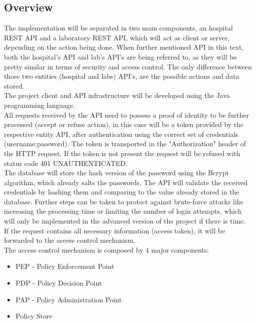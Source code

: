 \subsection{Overview}

The implementation will be separated in two main components, an hospital REST API\cite{springmvc} and a laboratory REST API, which will act as client or server, depending on the action being done. When further mentioned API in this text, both the hospital's API and lab's API's are being referred to, as they will be pretty similar in terms of security and access control. The only difference between those two entities (hospital and labs) API's, are the possible actions and data stored. \\

The project client and API infrastructure will be developed using the Java programming language. \\

All requests received by the API need to possess a proof of identity to be further processed (accept or refuse action), in this case will be a token provided by the respective entity API, after authentication using the correct set of credentials (username:password). The token is transported in the "Authorization" header of the HTTP request. If the token is not present the request will be refused with status code 401 UNAUTHENTICATED. \\

The database will store the hash version of the password using the Bcrypt\cite{bcrypt} algorithm, which already salts the passwords. The API will validate the received credentials by hashing them and comparing to the value already stored in the database. Further steps can be taken to protect against brute-force attacks like increasing the processing time or limiting the number of login attempts, which will only be implemented in the advanced version of the project if there is time. \\


If the request contains all necessary information (access token), it will be forwarded to the access control mechanism. \\

The access control mechanism is composed by 4 major components:
\begin{itemize}
	\item PEP - Policy Enforcement Point
	\item PDP - Policy Decision Point
	\item PAP - Policy Administration Point
	\item Policy Store
\end{itemize}

